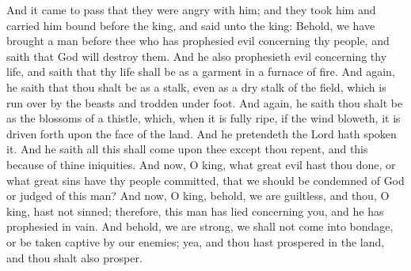 And it came to pass that they were angry with him; and they took him and carried him bound before the king, and said unto the king: Behold, we have brought a man before thee who has prophesied evil concerning thy people, and saith that God will destroy them.
\bverse \iffalse And he also prophesieth evil concerning thy life, and saith that thy life shall be as a garment in a furnace of fire. \fi
And he also prophesieth evil concerning thy life, and saith that thy life shall be as a garment in a furnace of fire.
\bverse \iffalse And again, he saith that thou shalt be as a stalk, even as a dry stalk of the field, which is run over by the beasts and trodden under foot. \fi
And again, he saith that thou shalt be as a stalk, even as a dry stalk of the field, which is run over by the beasts and trodden under foot.
\bverse \iffalse And again, he saith thou shalt be as the blossoms of a thistle, which, when it is fully ripe, if the wind bloweth, it is driven forth upon the face of the land. And he pretendeth the Lord hath spoken it. And he saith all this shall come upon thee except thou repent, and this because of thine iniquities. \fi
And again, he saith thou shalt be as the blossoms of a thistle, which, when it is fully ripe, if the wind bloweth, it is driven forth upon the face of the land. And he pretendeth the Lord hath spoken it. And he saith all this shall come upon thee except thou repent, and this because of thine iniquities.
\bverse \iffalse And now, O king, what great evil hast thou done, or what great sins have thy people committed, that we should be condemned of God or judged of this man? \fi
And now, O king, what great evil hast thou done, or what great sins have thy people committed, that we should be condemned of God or judged of this man?
\bverse \iffalse And now, O king, behold, we are guiltless, and thou, O king, hast not sinned; therefore, this man has lied concerning you, and he has prophesied in vain. \fi
And now, O king, behold, we are guiltless, and thou, O king, hast not sinned; therefore, this man has lied concerning you, and he has prophesied in vain.
\bverse \iffalse And behold, we are strong, we shall not come into bondage, or be taken captive by our enemies; yea, and thou hast prospered in the land, and thou shalt also prosper. \fi
And behold, we are strong, we shall not come into bondage, or be taken captive by our enemies; yea, and thou hast prospered in the land, and thou shalt also prosper.
\bverse \iffalse Behold, here is the man, we deliver him into thy hands; thou mayest do with him as seemeth thee good. \fi

